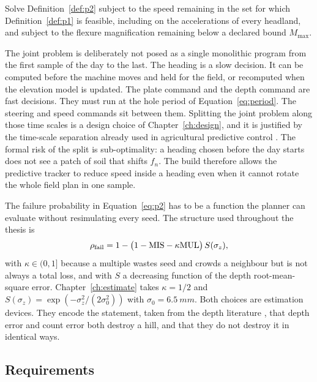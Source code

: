 \begin{definition}
\label{def:p3}
Solve Definition~\ref{def:p2} subject to the speed remaining in the set for which Definition~\ref{def:p1} is feasible, including on the accelerations of every headland, and subject to the flexure magnification remaining below a declared bound \(M_{\max}\).
\end{definition}

The joint problem is deliberately not posed as a single monolithic program from the first sample of the day to the last. The heading is a slow decision. It can be computed before the machine moves and held for the field, or recomputed when the elevation model is updated. The plate command and the depth command are fast decisions. They must run at the hole period of Equation~\eqref{eq:period}. The steering and speed commands sit between them. Splitting the joint problem along those time scales is a design choice of Chapter~\ref{ch:design}, and it is justified by the time-scale separation already used in agricultural predictive control \cite{xu2022,plessen2017}. The formal risk of the split is sub-optimality: a heading chosen before the day starts does not see a patch of soil that shifts \(f_n\). The build therefore allows the predictive tracker to reduce speed inside a heading even when it cannot rotate the whole field plan in one sample.

The failure probability in Equation~\eqref{eq:p2} has to be a function the planner can evaluate without resimulating every seed. The structure used throughout the thesis is
\begin{equation}
\label{eq:fail}
\rho_{\mathrm{fail}} = 1 - \bigl(1 - \mathrm{MIS} - \kappa\mathrm{MUL}\bigr)\, S(\sigma_z),
\end{equation}
with \(\kappa\in(0,1]\) because a multiple wastes seed and crowds a neighbour but is not always a total loss, and with \(S\) a decreasing function of the depth root-mean-square error. Chapter~\ref{ch:estimate} takes \(\kappa=1/2\) and \(S(\sigma_z)=\exp(-\sigma_z^2/(2\sigma_0^2))\) with \(\sigma_0=\SI{6.5}{mm}\). Both choices are estimation devices. They encode the statement, taken from the depth literature \cite{masarei2019,bond1999}, that depth error and count error both destroy a hill, and that they do not destroy it in identical ways.

\subsection{Requirements}

